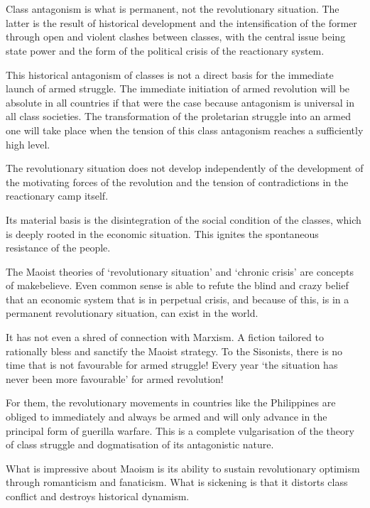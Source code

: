 \section{}
Class antagonism is what is permanent, 
not the revolutionary situation. 
The latter is the result of historical development 
and the intensification of the former 
through open and violent clashes between classes, 
with the central issue being state power 
and the form of the political crisis of the reactionary system.

This historical antagonism of classes 
is not a direct basis 
for the immediate launch of armed struggle. 
The immediate initiation of armed revolution 
will be absolute in all countries 
if that were the case 
because antagonism is universal in all class societies. 
The transformation of the proletarian struggle into an armed one 
will take place when the tension of this class antagonism
reaches a sufficiently high level.

The revolutionary situation does not develop independently 
of the development of the motivating forces of the revolution 
and the tension of contradictions in the reactionary camp itself.

Its material basis is the disintegration 
of the social condition of the classes, 
which is deeply rooted in the economic situation. 
This ignites the spontaneous resistance of the people.

The Maoist theories of `revolutionary situation' and `chronic crisis' 
are concepts of makebelieve. 
Even common sense is able to refute the blind and crazy belief 
that an economic system that is in perpetual crisis, and
because of this, is in a permanent revolutionary situation, 
can exist in the world.

It has not even a shred of connection with Marxism. 
A fiction tailored to rationally bless and sanctify the Maoist strategy. 
To the Sisonists, there is no time that is not favourable for armed struggle! 
Every year `the situation has never been more favourable' for armed revolution!

For them, the revolutionary movements in countries like the Philippines 
are obliged to immediately and always be armed 
and will only advance in the principal form of guerilla warfare. 
This is a complete vulgarisation of the theory of class struggle and 
dogmatisation of its antagonistic nature.

What is impressive about Maoism is its ability to sustain 
revolutionary optimism through romanticism and fanaticism. 
What is sickening is that it distorts class conflict 
and destroys historical dynamism.

